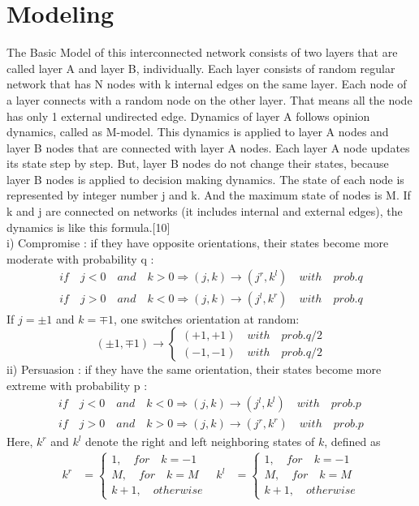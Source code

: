 \documentclass[english]{cccconf}
\begin{document}
\section{Modeling}
The Basic Model of this interconnected network consists of two layers that are called layer A and layer B, individually. Each layer consists of random regular network that has N nodes with k internal edges on the same layer. Each node of a layer connects with a random node on the other layer. That means all the node has only 1 external undirected edge.
Dynamics of layer A follows opinion dynamics, called as M-model. This dynamics is applied to layer A nodes and layer B nodes that are connected with layer A nodes. Each layer A node updates its state step by step. But, layer B nodes do not change their states, because layer B nodes is applied to decision making dynamics. The state of each node is represented by integer number j and k. And the maximum state of nodes is M. If k and j are connected on networks (it includes internal and external edges), the dynamics is like this formula.[10] \\
i) Compromise : if they have opposite orientations, their states become more moderate with probability q :
\begin{align*}
  \label{eq1}
  if \quad j<0 \quad and \quad k>0  \Rightarrow (j, k) \rightarrow (j^r, k^l) \quad with\quad prob.q\\
  if \quad j>0 \quad and \quad k<0  \Rightarrow (j, k) \rightarrow (j^l, k^r) \quad with\quad prob.q
\end{align*}
If $j = \pm1$ and $k = \mp1$, one switches orientation at random:
\begin{equation*}
(\pm 1, \mp 1)\rightarrow \left\{\begin{matrix}
(+1, +1) \quad with \quad prob.q/2
\\(-1, -1)\quad with \quad prob.q/2
\end{matrix}\right.
\end{equation*}
ii) Persuasion : if they have the same orientation, their states become more extreme with probability p :
\begin{align*}
 if \quad j<0 \quad and \quad k<0  \Rightarrow (j, k) \rightarrow (j^l, k^l) \quad with\quad prob.p\\
 if \quad j>0 \quad and \quad k>0  \Rightarrow (j, k) \rightarrow (j^r, k^r) \quad with\quad prob.p
\end{align*}
Here, $k^r$ and $k^l$ denote the right and left neighboring states of $k$, defined as
\begin{align}
k^r &= \left\{\begin{matrix}
1,\quad for\quad k= -1
\\ M,\quad for \quad k=M
\\ k+1,\quad otherwise
\end{matrix}\right. &
k^l &= \left\{\begin{matrix}
1,\quad for\quad k= -1
\\ M,\quad for \quad k=M
\\ k+1,\quad otherwise
\end{matrix}\right.
\end{align}
\end{document}

